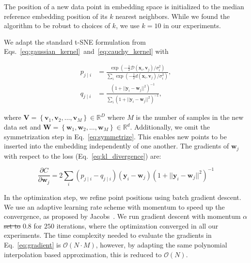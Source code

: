 \documentclass[runningheads]{llncs}
\providecommand{\DIFadd}[1]{{\protect\color{blue}\uwave{#1}}} %
\providecommand{\DIFdel}[1]{{\protect\color{red}\sout{#1}}}                      %
\providecommand{\DIFaddbegin}{} %
\providecommand{\DIFaddend}{} %
\providecommand{\DIFdelbegin}{} %
\providecommand{\DIFdelend}{} %
\newcommand{\DIFscaledelfig}{0.5}
\newlength{\DIFdelgraphicswidth} %
\newlength{\DIFdelgraphicsheight} %
\newcommand{\DIFaddincludegraphics}[2][]{{\color{blue}\fbox{\DIFOincludegraphics[#1]{#2}}}} %
\newcommand{\DIFdelincludegraphics}[2][]{%
\sbox{\DIFdelgraphicsbox}{\DIFOincludegraphics[#1]{#2}}%
\settoboxwidth{\DIFdelgraphicswidth}{\DIFdelgraphicsbox} %
\settoboxtotalheight{\DIFdelgraphicsheight}{\DIFdelgraphicsbox} %
\scalebox{\DIFscaledelfig}{%
\parbox[b]{\DIFdelgraphicswidth}{\usebox{\DIFdelgraphicsbox}\\[-\baselineskip] \rule{\DIFdelgraphicswidth}{0em}}\llap{\resizebox{\DIFdelgraphicswidth}{\DIFdelgraphicsheight}{%
\setlength{\unitlength}{\DIFdelgraphicswidth}%
\begin{picture}(1,1)%
\thicklines\linethickness{2pt} %
{\color[rgb]{1,0,0}\put(0,0){\framebox(1,1){}}}%
{\color[rgb]{1,0,0}\put(0,0){\line( 1,1){1}}}%
{\color[rgb]{1,0,0}\put(0,1){\line(1,-1){1}}}%
\end{picture}%
}\hspace*{3pt}}} %
} %
\DeclareRobustCommand{\DIFaddbegin}{\DIFOaddbegin \let\includegraphics\DIFaddincludegraphics} %
\DeclareRobustCommand{\DIFaddend}{\DIFOaddend \let\includegraphics\DIFOincludegraphics} %
\DeclareRobustCommand{\DIFdelbegin}{\DIFOdelbegin \let\includegraphics\DIFdelincludegraphics} %
\DeclareRobustCommand{\DIFdelend}{\DIFOaddend \let\includegraphics\DIFOincludegraphics} %
\begin{document}
The position of a new data
point in embedding space is initialized 
to the median reference embedding position of its $k$ nearest 
neighbors. While we found the algorithm to be
robust to choices of $k$, we use $k=10$ in our experiments.

We adapt the standard t-SNE formulation from
Eqs.~\ref{eq:gaussian_kernel}~and~\ref{eq:cauchy_kernel} with

\begin{align}
p_{j \mid i} &= \frac{\exp \left ( -\frac{1}{2} \mathcal{D}(\mathbf{x}_i, \mathbf{v}_j) / \sigma_i^2 \right )}{\sum_{i} \exp \left ( -\frac{1}{2} d(\mathbf{x}_i, \mathbf{v}_j) / \sigma_i^2 \right )}, \\
q_{j \mid i} &= \frac{\left ( 1 + || \mathbf{y}_i - \mathbf{w}_j ||^2 \right )^{-1}}{\sum_{i}\left ( 1 + || \mathbf{y}_i - \mathbf{w}_j ||^2 \right )^{-1}},
\end{align}

\noindent where $\mathbf{V} = \left \{ \mathbf{v}_1, \mathbf{v}_2, \dots,
\mathbf{v}_M \right \} \in \mathbb{R}^D$ where $M$ is the number of samples in
the new data set and $\mathbf{W} = \left \{ \mathbf{w}_1, \mathbf{w}_2, \dots,
\mathbf{w}_M \right \} \in \mathbb{R}^d$. Additionally, we omit the
symmetrization step in Eq.~\ref{eq:symmetrize}. This enables new points to be
inserted into the embedding independently of one another. The gradients of
$\mathbf{w}_j$ with respect to the loss (Eq.~\ref{eq:kl_divergence}) are:

\begin{equation}
\frac{\partial C}{\partial \mathbf{w}_j} = 2 \sum_i \left ( p_{j \mid i} - q_{j \mid i} \right ) \left ( \mathbf{y}_i - \mathbf{w}_j \right ) \left ( 1 + || \mathbf{y}_i - \mathbf{w}_j || ^2 \right )^{-1}
\label{eq:gradient}
\end{equation}

In the optimization step, we refine point positions using batch gradient
descent. We use an adaptive learning rate scheme with momentum 
to speed up the convergence, as proposed by Jacobs~\cite{momentum,bh_tsne}. We run gradient descent
with momentum $\alpha$ \DIFdelbegin \DIFdel{set to }\DIFdelend \DIFaddbegin \DIFadd{of }\DIFaddend $0.8$ for $250$ iterations, where the
optimization converged in all our experiments. The time complexity
needed to evaluate the gradients in Eq.~\ref{eq:gradient} is $\mathcal{O}(N
\cdot M)$, however, by adapting the same polynomial interpolation based
approximation, this is reduced to $\mathcal{O}(N)$.
\end{document}
